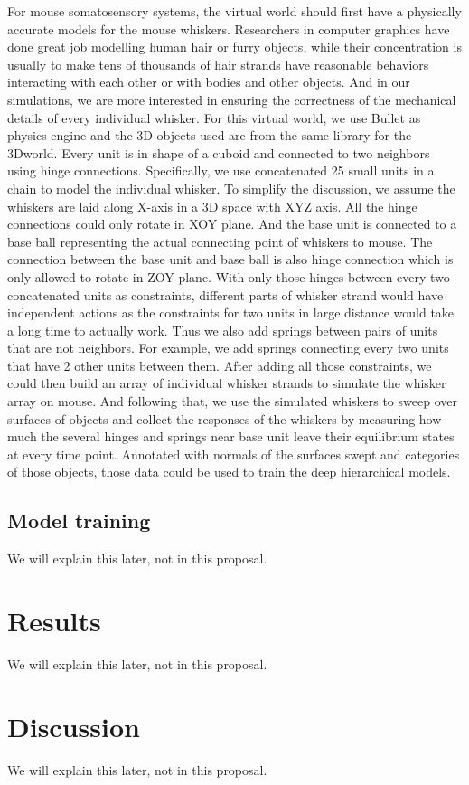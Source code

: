 \documentclass[12pt]{article}
\begin{document}
For mouse somatosensory systems, the virtual world should first have a physically accurate models for the mouse whiskers. 
Researchers in computer graphics have done great job modelling human hair or furry objects\cite{Hadap2008, Ward2007}, while their concentration is usually to make tens of thousands of hair strands have reasonable behaviors interacting with each other or with bodies and other objects. 
And in our simulations, we are more interested in ensuring the correctness of the mechanical details of every individual whisker. For this virtual world, we use Bullet \cite{wiki:bullet} as physics engine and the 3D objects used are from the same library for the 3Dworld. Every unit is in shape of a cuboid and connected to two neighbors using hinge connections.
Specifically, we use concatenated 25 small units in a chain to model the individual whisker.  
To simplify the discussion, we assume the whiskers are laid along X-axis in a 3D space with XYZ axis. All the hinge connections could only rotate in XOY plane. And the base unit is connected to a base ball representing the actual connecting point of whiskers to mouse. The connection between the base unit and base ball is also hinge connection which is only allowed to rotate in ZOY plane.
With only those hinges between every two concatenated units as constraints, different parts of whisker strand would have independent actions as the constraints for two units in large distance would take a long time to actually work. Thus we also add springs between pairs of units that are not neighbors. For example, we add springs connecting every two units that have 2 other units between them.
After adding all those constraints, we could then build an array of individual whisker strands to simulate the whisker array on mouse. And following that, we use the simulated whiskers to sweep over surfaces of objects and collect the responses of the whiskers by measuring how much the several hinges and springs near base unit leave their equilibrium states at every time point. Annotated with normals of the surfaces swept and categories of those objects, those data could be used to train the deep hierarchical models.

\subsection*{Model training}

We will explain this later, not in this proposal.

\section*{Results}

We will explain this later, not in this proposal.

\section*{Discussion}

We will explain this later, not in this proposal.



%
%

\end{document}
